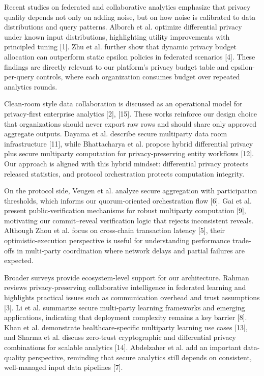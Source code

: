 Recent studies on federated and collaborative analytics emphasize that privacy quality depends not only on adding noise, but on how noise is calibrated to data distributions and query patterns. Alborch et al. optimize differential privacy under known input distributions, highlighting utility improvements with principled tuning [1]. Zhu et al. further show that dynamic privacy budget allocation can outperform static epsilon policies in federated scenarios [4]. These findings are directly relevant to our platform's privacy budget table and epsilon-per-query controls, where each organization consumes budget over repeated analytics rounds.

Clean-room style data collaboration is discussed as an operational model for privacy-first enterprise analytics [2], [15]. These works reinforce our design choice that organizations should never export raw rows and should share only approved aggregate outputs. Dayama et al. describe secure multiparty data room infrastructure [11], while Bhattacharya et al. propose hybrid differential privacy plus secure multiparty computation for privacy-preserving entity workflows [12]. Our approach is aligned with this hybrid mindset: differential privacy protects released statistics, and protocol orchestration protects computation integrity.

On the protocol side, Veugen et al. analyze secure aggregation with participation thresholds, which informs our quorum-oriented orchestration flow [6]. Gai et al. present public-verification mechanisms for robust multiparty computation [9], motivating our commit--reveal verification logic that rejects inconsistent reveals. Although Zhou et al. focus on cross-chain transaction latency [5], their optimistic-execution perspective is useful for understanding performance trade-offs in multi-party coordination where network delays and partial failures are expected.

Broader surveys provide ecosystem-level support for our architecture. Rahman reviews privacy-preserving collaborative intelligence in federated learning and highlights practical issues such as communication overhead and trust assumptions [3]. Li et al. summarize secure multi-party learning frameworks and emerging applications, indicating that deployment complexity remains a key barrier [8]. Khan et al. demonstrate healthcare-specific multiparty learning use cases [13], and Sharma et al. discuss zero-trust cryptographic and differential privacy combinations for scalable analytics [14]. Abdelzaher et al. add an important data-quality perspective, reminding that secure analytics still depends on consistent, well-managed input data pipelines [7].

